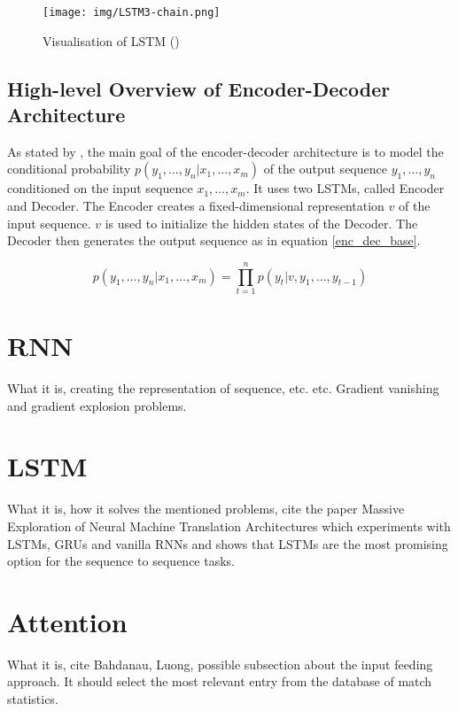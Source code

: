 \begin{figure}[h]
    \centering
    \texttt{[image: img/LSTM3-chain.png]}
    \caption{Visualisation of LSTM (\citep{Olah2015})} \label{lstm}
\end{figure}

\subsection{High-level Overview of Encoder-Decoder Architecture}

As stated by \citep{sutskever2014sequence}, the main goal of the encoder-decoder architecture is to model the conditional probability $p(y_1,\dots,y_n | x_1,\dots,x_m)$ of the output sequence $y_1,\dots,y_n$ conditioned on the input sequence $x_1,\dots,x_m$. It uses two LSTMs, called Encoder and Decoder. The Encoder creates a fixed-dimensional representation $v$ of the input sequence. $v$ is used to initialize the hidden states of the Decoder. The Decoder then generates the output sequence as in equation \ref{enc_dec_base}.

\begin{equation} \label{enc_dec_base}
p(y_1,\dots,y_n | x_1,\dots,x_m) = \prod_{t=1}^{n}{p(y_t | v, y_1,\dots,y_{t-1})}
\end{equation}

\section{RNN}
What it is, creating the representation of sequence, etc. etc. Gradient vanishing and gradient explosion problems.

\section{LSTM}
What it is, how it solves the mentioned problems, cite the paper Massive Exploration of Neural Machine Translation Architectures which experiments with LSTMs, GRUs and vanilla RNNs and shows that LSTMs are the most promising option for the sequence to sequence tasks.

\section{Attention}
What it is, cite Bahdanau, Luong, possible subsection about the input feeding approach. It should select the most relevant entry from the database of match statistics.

